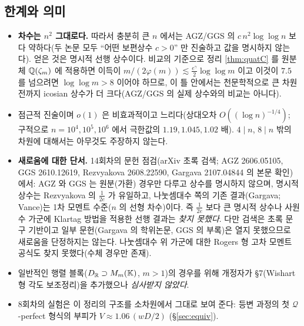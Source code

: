 \subsection{한계와 의미}
\begin{itemize}
\item \textbf{차수는 $n^2$ 그대로다.} 따라서 충분히 큰 $n$ 에서는 AGZ/GGS 의 $c\,n^2\log\log n$ 보다 약하다(두 논문 모두 ``어떤 보편상수 $c>0$'' 만 진술하고 값을 명시하지 않는다). 얻은 것은 명시적 선행 상수이다. 비교의 기준으로 정리 \ref{thm:quatC} 를 원분체 $\mathbb{Q}(\zeta_m)$ 에 적용하면 이득이 $m/(2\varphi(m))\lesssim\tfrac{e^\gamma}2\log\log m$ 이고 이것이 $7.5$ 를 넘으려면 $\log\log m>8$ 이어야 하므로, 이 틀 안에서는 천문학적으로 큰 차원 전까지 icosian 상수가 더 크다(AGZ/GGS 의 실제 상수와의 비교는 아니다).
\item 점근적 진술이며 $o(1)$ 은 비효과적이고 느리다(상대오차 $O((\log n)^{-1/4})$; 구적으로 $n=10^4,10^5,10^6$ 에서 극한값의 $1.19,1.045,1.02$ 배). $4\mid n$, $8\mid n$ 밖의 차원에 대해서는 아무것도 주장하지 않는다.
\item \textbf{새로움에 대한 단서.} 14회차의 문헌 점검(arXiv 초록 검색; AGZ 2606.05105, GGS 2610.12619, Rezvyakova 2608.22590, Gargava 2107.04844 의 본문 확인)에서: AGZ 와 GGS 는 원분(가환) 경우만 다루고 상수를 명시하지 않으며, 명시적 상수는 Rezvyakova 의 $\tfrac1{2e}$ 가 유일하고, 나눗셈대수 쪽의 기존 결과(Gargava; Vance)는 1차 모멘트 수준($n$ 의 선형 차수)이다. 즉 $\tfrac1{2e}$ 보다 큰 명시적 상수나 사원수 가군에 Klartag 방법을 적용한 선행 결과는 \emph{찾지 못했다}. 다만 검색은 초록 문구 기반이고 일부 문헌(Gargava 의 학위논문, GGS 의 부록)은 열지 못했으므로 새로움을 단정하지는 않는다. 나눗셈대수 위 가군에 대한 Rogers 형 고차 모멘트 공식도 찾지 못했다(수체 경우만 존재).
\item 일반적인 행렬 블록($D_{\mathbb{R}}\supset M_m(\mathbb K)$, $m>1$)의 경우를 위해 개정자가 \S7(Wishart 형 각도 보조정리)을 추가했으나 \emph{심사받지 않았다}.
\item 8회차의 실험은 이 정리의 구조를 소차원에서 그대로 보여 준다: 등변 과정의 첫 $\mathcal Q$-perfect 형식의 부피가 $V\approx1.06\,(wD/2)$ (\S\ref{sec:equiv}).
\end{itemize}

